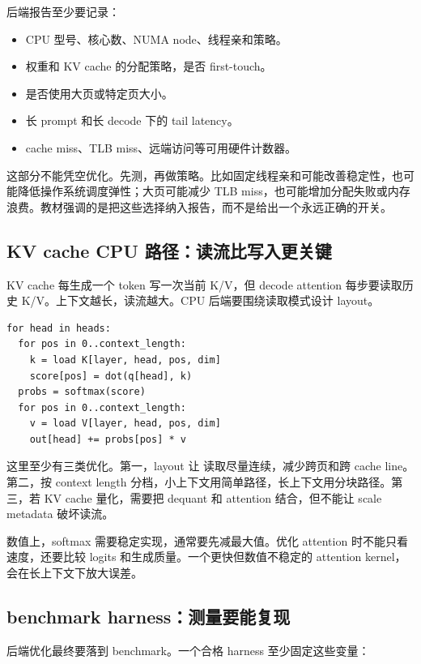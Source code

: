 后端报告至少要记录：

\begin{itemize}
  \item CPU 型号、核心数、NUMA node、线程亲和策略。
  \item 权重和 KV cache 的分配策略，是否 first-touch。
  \item 是否使用大页或特定页大小。
  \item 长 prompt 和长 decode 下的 tail latency。
  \item cache miss、TLB miss、远端访问等可用硬件计数器。
\end{itemize}

这部分不能凭空优化。先测，再做策略。比如固定线程亲和可能改善稳定性，也可能降低操作系统调度弹性；大页可能减少 TLB miss，也可能增加分配失败或内存浪费。教材强调的是把这些选择纳入报告，而不是给出一个永远正确的开关。

\subsection{KV cache CPU 路径：读流比写入更关键}

KV cache 每生成一个 token 写一次当前 K/V，但 decode attention 每步要读取历史 K/V。上下文越长，读流越大。CPU 后端要围绕读取模式设计 layout。

\begin{lstlisting}[numbers=none,caption={decode attention 的读流}]
for head in heads:
  for pos in 0..context_length:
    k = load K[layer, head, pos, dim]
    score[pos] = dot(q[head], k)
  probs = softmax(score)
  for pos in 0..context_length:
    v = load V[layer, head, pos, dim]
    out[head] += probs[pos] * v
\end{lstlisting}

这里至少有三类优化。第一，layout 让  读取尽量连续，减少跨页和跨 cache line。第二，按 context length 分档，小上下文用简单路径，长上下文用分块路径。第三，若 KV cache 量化，需要把 dequant 和 attention 结合，但不能让 scale metadata 破坏读流。

数值上，softmax 需要稳定实现，通常要先减最大值。优化 attention 时不能只看速度，还要比较 logits 和生成质量。一个更快但数值不稳定的 attention kernel，会在长上下文下放大误差。

\subsection{benchmark harness：测量要能复现}

后端优化最终要落到 benchmark。一个合格 harness 至少固定这些变量：

